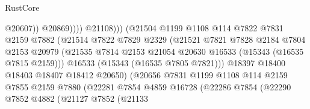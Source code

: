 \begin{lexlean}{RustCore}
\begin{coremodule}
                                                  @20607))
                                              @20869))))
                                      @21108)))
                                (@21504
                                  @1199
                                  @1108
                                  @114
                                  @7822
                                  @7831
                                  @2159
                                  @7882
                                  (@21514
                                    @7822
                                    @7829
                                    @2329
                                    (@21521
                                      @7821
                                      @7828
                                      @2184
                                      @7804
                                      @2153
                                      @20979
                                      (@21535
                                        @7814
                                        @2153
                                        @21054
                                        @20630
                                        @16533
                                        (@15343 (@16535 @7815 @2159)))
                                      @16533
                                      (@15343 (@16535 @7805 @7821)))
                                    @18397
                                    @18400
                                    @18403
                                    @18407
                                    @18412
                                    @20650)
                                  (@20656
                                    @7831
                                    @1199
                                    @1108
                                    @114
                                    @2159
                                    @7855
                                    @2159
                                    @7880
                                    (@22281
                                      @7854
                                      @4859
                                      @16728
                                      (@22286
                                        @7854
                                        (@22290
                                          @7852
                                          @4882
                                          (@21127
                                            @7852
                                            (@21133

\end{coremodule}
\end{lexlean}
